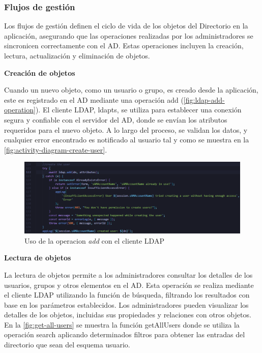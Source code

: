 \subsubsection{Flujos de gestión}

Los flujos de gestión definen el ciclo de vida de los objetos del Directorio en la aplicación, asegurando que las operaciones realizadas por los administradores se sincronicen correctamente con el AD. Estas operaciones incluyen la creación, lectura, actualización y eliminación de objetos.

\textbf{Creación de objetos}

Cuando un nuevo objeto, como un usuario o grupo, es creado desde la aplicación, este es registrado en el AD mediante una operación add (\autoref{fig:ldap-add-operation}). El cliente LDAP, ldapts, se utiliza para establecer una conexión segura y confiable con el servidor del AD, donde se envían los atributos requeridos para el nuevo objeto. A lo largo del proceso, se validan los datos, y cualquier error encontrado es notificado al usuario tal y como se muestra en la \autoref{fig:activity-diagram-create-user}.

\begin{figure}[h]
    \centering
    \includegraphics[width=\linewidth]{images/code/ldap-add-operation.png}
    \caption{Uso de la operacion \textit{add} con el cliente LDAP}
    \label{fig:ldap-add-operation}
\end{figure}

\textbf{Lectura de objetos}

La lectura de objetos permite a los administradores consultar los detalles de los usuarios, grupos y otros elementos en el AD. Esta operación se realiza mediante el cliente LDAP utilizando la función de búsqueda, filtrando los resultados con base en los parámetros establecidos. Los administradores pueden visualizar los detalles de los objetos, incluidas sus propiedades y relaciones con otros objetos. En la \autoref{fig:get-all-users} se muestra la función getAllUsers donde se utiliza la operación search aplicando determinados filtros para obtener las entradas del directorio que sean del esquema usuario.

